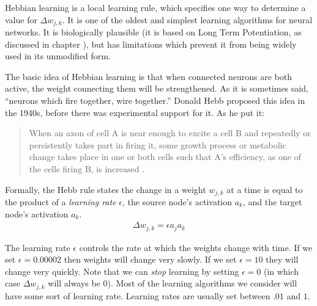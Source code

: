 Hebbian learning is a local learning rule, which specifies one way to determine a value for $\Delta w_{j,k}$. It is one of the oldest and simplest learning algorithms for neural networks. It is biologically plausible (it is based on Long Term Potentiation, as discussed in chapter ), but has limitations which prevent it from being widely used in its unmodified form. 

The basic idea of Hebbian learning is that when connected neurons are both active, the weight connecting them will be strengthened. As it is sometimes said, ``neurons which fire  together, wire together.'' Donald Hebb proposed this idea in the 1940s, before there was experimental  support for it. As he put it:
\begin{quote}
When an axon of cell A is near enough to excite a cell B and repeatedly or persistently takes part in firing it, some growth process or metabolic change takes place in one or both cells such that A's efficiency, as one of the cells firing B, is increased \cite{hebb2005organization}.
\end{quote}

  Formally,  the Hebb rule states the change in a weight $w_{j,k}$ at a time is 
equal to the product of a \emph{learning rate} $\epsilon$, the source node's 
activation $a_k$, and the target node's activation $a_k$. 
\begin{eqnarray*}
\Delta w_{j,k} = \epsilon a_j a_k
\end{eqnarray*}

The learning rate $\epsilon$ controls the rate at which the weights change with time. If we set $\epsilon=0.00002$ then weights will change very slowly. If we set $\epsilon=10$ they will change very quickly. Note that we can \emph{stop} learning by setting $\epsilon=0$ (in which case $\Delta w_{j,k}$ will always be 0). Most of the learning algorithms we consider will have some sort of learning rate. Learning rates are usually set between $.01$ and $1$.


